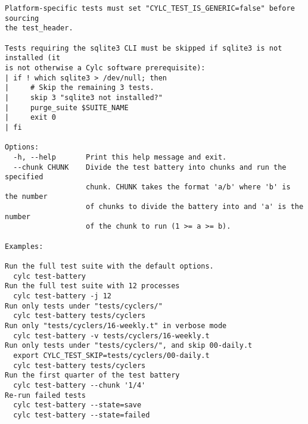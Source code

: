 \begin{lstlisting}
Platform-specific tests must set "CYLC_TEST_IS_GENERIC=false" before sourcing
the test_header.

Tests requiring the sqlite3 CLI must be skipped if sqlite3 is not installed (it
is not otherwise a Cylc software prerequisite):
| if ! which sqlite3 > /dev/null; then
|     # Skip the remaining 3 tests.
|     skip 3 "sqlite3 not installed?"
|     purge_suite $SUITE_NAME
|     exit 0
| fi

Options:
  -h, --help       Print this help message and exit.
  --chunk CHUNK    Divide the test battery into chunks and run the specified
                   chunk. CHUNK takes the format 'a/b' where 'b' is the number
                   of chunks to divide the battery into and 'a' is the number
                   of the chunk to run (1 >= a >= b).

Examples:

Run the full test suite with the default options.
  cylc test-battery
Run the full test suite with 12 processes
  cylc test-battery -j 12
Run only tests under "tests/cyclers/"
  cylc test-battery tests/cyclers
Run only "tests/cyclers/16-weekly.t" in verbose mode
  cylc test-battery -v tests/cyclers/16-weekly.t
Run only tests under "tests/cyclers/", and skip 00-daily.t
  export CYLC_TEST_SKIP=tests/cyclers/00-daily.t
  cylc test-battery tests/cyclers
Run the first quarter of the test battery
  cylc test-battery --chunk '1/4'
Re-run failed tests
  cylc test-battery --state=save
  cylc test-battery --state=failed
\end{lstlisting}
